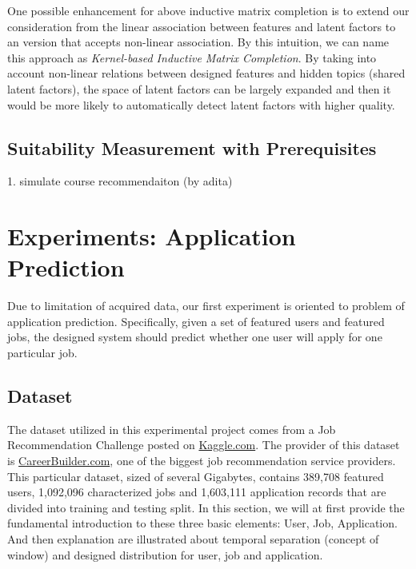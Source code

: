 \documentclass{article} %
\begin{document}
One possible enhancement for above inductive matrix completion is to
extend our consideration from the linear association between features and
latent factors to an version that accepts non-linear association.
By this intuition, we can name this approach as 
    {\it Kernel-based Inductive Matrix Completion}.
By taking into account non-linear relations between designed features and hidden
topics (shared latent factors), the space of latent factors can be largely
expanded and then it would be more likely to automatically detect latent
factors with higher quality. 
 

\subsection{Suitability Measurement with Prerequisites}
1. simulate course recommendaiton (by adita)

\section{Experiments: Application Prediction}
Due to limitation of acquired data, our first experiment is oriented to
problem of application prediction. Specifically, given a set of featured users
and featured jobs, the designed system should predict whether one user will
apply for one particular job.

\subsection{Dataset}
The dataset utilized in this experimental project comes from a Job
Recommendation Challenge posted on
\href{http://www.kaggle.com/c/job-recommendation/data}{Kaggle.com}. The
provider of this dataset is
\href{http://www.careerbuilder.com/}{CareerBuilder.com}, one of the biggest
job recommendation service providers. This particular dataset, sized of several
Gigabytes, contains 389,708 featured users, 1,092,096
characterized jobs and 1,603,111 application records that are divided into
training and testing split.  In this section, we will at first provide the
fundamental introduction to these three basic elements: User, Job,
Application. And then explanation are illustrated about temporal separation (concept of
window) and designed distribution for user, job and application. 
\end{document}
